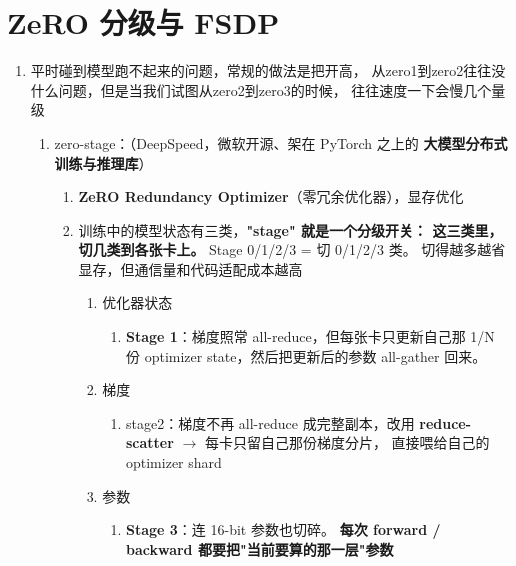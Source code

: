 \documentclass[UTF8,fontset=fandol]{ctexart}
\begin{document}
\section{ZeRO 分级与 FSDP}
\label{sec:zero}

\begin{enumerate}
  \item 平时碰到模型跑不起来的问题，常规的做法是把开高，
    从zero1到zero2往往没什么问题，但是当我们试图从zero2到zero3的时候，
    往往速度一下会慢几个量级
  \begin{enumerate}
    \item zero-stage：（DeepSpeed，微软开源、架在 PyTorch 之上的
      \textbf{大模型分布式训练与推理库}）
    \begin{enumerate}
      \item \textbf{ZeRO Redundancy Optimizer}（零冗余优化器），显存优化
      \item 训练中的模型状态有三类，\textbf{"stage" 就是一个分级开关：
        这三类里，切几类到各张卡上。} Stage 0/1/2/3 = 切 0/1/2/3 类。
        切得越多越省显存，但通信量和代码适配成本越高
      \begin{enumerate}
        \item 优化器状态
        \begin{enumerate}
          \item \textbf{Stage 1}：梯度照常 all-reduce，但每张卡只更新自己那
            1/N 份 optimizer state，然后把更新后的参数 all-gather 回来。
        \end{enumerate}
        \item 梯度
        \begin{enumerate}
          \item stage2：梯度不再 all-reduce 成完整副本，改用
            \textbf{reduce-scatter} $\to$ 每卡只留自己那份梯度分片，
            直接喂给自己的 optimizer shard
        \end{enumerate}
        \item 参数
        \begin{enumerate}
          \item \textbf{Stage 3}：连 16-bit 参数也切碎。
            \textbf{每次 forward / backward 都要把"当前要算的那一层"参数
}
\end{enumerate}
\end{enumerate}
\end{enumerate}
\end{enumerate}
\end{enumerate}
\end{document}
